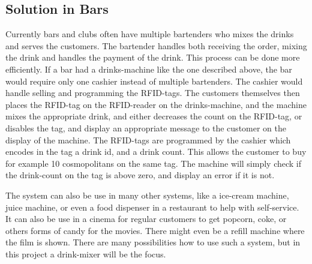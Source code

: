 \subsection{Solution in Bars}
Currently bars and clubs often have multiple bartenders who mixes the drinks and serves the customers. The bartender handles both receiving the order, mixing the drink and handles the payment of the drink. This process can be done more efficiently. If a bar had a drinks-machine like the one described above, the bar would require only one cashier instead of multiple bartenders. The cashier would handle selling and programming the RFID-tags. The customers themselves then places the RFID-tag on the RFID-reader on the drinks-machine, and the machine mixes the appropriate drink, and either decreases the count on the RFID-tag, or disables the tag, and display an appropriate message to the customer on the display of the machine. The RFID-tags are programmed by the cashier which encodes in the tag a drink id, and a drink count. This allows the customer to buy for example 10 cosmopolitans on the same tag. The machine will simply check if the drink-count on the tag is above zero, and display an error if it is not.

The system can also be use in many other systems, like a ice-cream machine, juice machine, or even a food dispenser in a restaurant to help with self-service. It can also be use in a cinema for regular customers to get popcorn, coke, or others forms of candy for the movies. There might even be a refill machine where the film is shown. There are many possibilities how to use such a system, but in this project a drink-mixer will be the focus.
